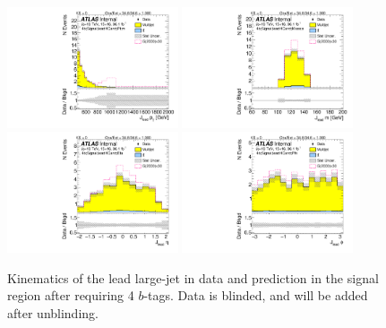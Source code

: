 \begin{figure}[htbp!]
\begin{center}
\includegraphics[width=0.45\textwidth,angle=-90]{figures/boosted/Signal/b77_FourTag_Signal_leadHCand_Pt_m_blind.pdf}
\includegraphics[width=0.45\textwidth,angle=-90]{figures/boosted/Signal/b77_FourTag_Signal_leadHCand_Mass_s_blind.pdf}\\
\includegraphics[width=0.45\textwidth,angle=-90]{figures/boosted/Signal/b77_FourTag_Signal_leadHCand_Eta_blind.pdf}
\includegraphics[width=0.45\textwidth,angle=-90]{figures/boosted/Signal/b77_FourTag_Signal_leadHCand_Phi_blind.pdf}
  \caption{Kinematics of the lead large-\R jet in data and prediction in the signal region after requiring 4 $b$-tags. Data is blinded, and will be added after unblinding.}
  \label{fig:boosted-4b-signal-blind-ak10-lead}
\end{center}
\end{figure}

